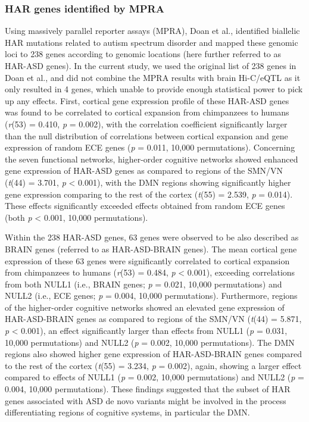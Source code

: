 \begin{refsection}
\subsubsection{HAR genes identified by MPRA}
Using massively parallel reporter assays (MPRA), Doan et al., \citep{doan2016mutations} identified biallelic HAR mutations related to autism spectrum disorder and mapped these genomic loci to 238 genes according to genomic locations (here further referred to as HAR-ASD genes). In the current study, we used the original list of 238 genes in Doan et al., and did not combine the MPRA results with brain Hi-C/eQTL as it only resulted in 4 genes, which unable to provide enough statistical power to pick up any effects. First, cortical gene expression profile of these HAR-ASD genes was found to be correlated to cortical expansion from chimpanzees to humans (\textit{r}(53) = 0.410, \textit{p} = 0.002), with the correlation coefficient significantly larger than the null distribution of correlations between cortical expansion and gene expression of random ECE genes (\textit{p} = 0.011, 10,000 permutations). Concerning the seven functional networks, higher-order cognitive networks showed enhanced gene expression of HAR-ASD genes as compared to regions of the SMN/VN (\textit{t}(44) = 3.701, \textit{p} < 0.001), with the DMN regions showing significantly higher gene expression comparing to the rest of the cortex (\textit{t}(55) = 2.539, \textit{p} = 0.014). These effects significantly exceeded effects obtained from random ECE genes (both \textit{p} < 0.001, 10,000 permutations).

 Within the 238 HAR-ASD genes, 63 genes were observed to be also described as BRAIN genes (referred to as HAR-ASD-BRAIN genes). The mean cortical gene expression of these 63 genes were significantly correlated to cortical expansion from chimpanzees to humans (\textit{r}(53) = 0.484, \textit{p} < 0.001), exceeding correlations from both NULL1 (i.e., BRAIN genes; \textit{p} = 0.021, 10,000 permutations) and NULL2 (i.e., ECE genes; \textit{p} = 0.004, 10,000 permutations). Furthermore, regions of the higher-order cognitive networks showed an elevated gene expression of HAR-ASD-BRAIN genes as compared to regions of the SMN/VN (\textit{t}(44) = 5.871, \textit{p} < 0.001), an effect significantly larger than effects from NULL1 (\textit{p} = 0.031, 10,000 permutations) and NULL2 (\textit{p} = 0.002, 10,000 permutations). The DMN regions also showed higher gene expression of HAR-ASD-BRAIN genes compared to the rest of the cortex (\textit{t}(55) = 3.234, \textit{p} = 0.002), again, showing a larger effect compared to effects of NULL1 (\textit{p} = 0.002, 10,000 permutations) and NULL2 (\textit{p} = 0.004, 10,000 permutations). These findings suggested that the subset of HAR genes associated with ASD de novo variants might be involved in the process differentiating regions of cognitive systems, in particular the DMN.


\end{refsection}
